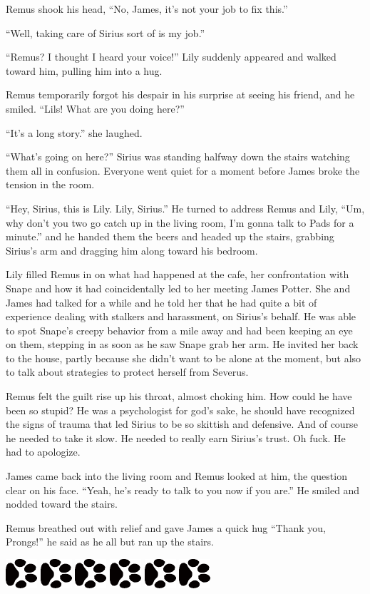 \documentclass[12pt,twoside,openright]{memoir}
\newcommand{\myrulez}{	
	\begin{center}
		\hspace{.5em}
		\includegraphics[angle=60]{dogprint.pdf}
		\hspace{.5em}
		\includegraphics[angle=120]{dogprint.pdf}
		\hspace{.5em}
		\includegraphics[angle=60]{dogprint.pdf}
		\hspace{.5em}
		\includegraphics[angle=120]{dogprint.pdf}
		\hspace{.5em}
		\includegraphics[angle=60]{dogprint.pdf}
		\hspace{.5em}
		\includegraphics[angle=120]{dogprint.pdf}
		\hspace{.5em}
	\end{center}
}
\begin{document}
Remus shook his head, ``No, James, it's not your job to fix this.''

``Well, taking care of Sirius sort of is my job.''

``Remus? I thought I heard your voice!'' Lily suddenly appeared and walked toward him, pulling him into a hug. 

Remus temporarily forgot his despair in his surprise at seeing his friend, and he smiled. ``Lils! What are you doing here?'' 

``It's a long story.'' she laughed. 

``What's going on here?'' Sirius was standing halfway down the stairs watching them all in confusion. Everyone went quiet for a moment before James broke the tension in the room. 

``Hey, Sirius, this is Lily. Lily, Sirius.'' He turned to address Remus and Lily, ``Um, why don't you two go catch up in the living room, I'm gonna talk to Pads for a minute.'' and he handed them the beers and headed up the stairs, grabbing Sirius's arm and dragging him along toward his bedroom.

Lily filled Remus in on what had happened at the cafe, her confrontation with Snape and how it had coincidentally led to her meeting James Potter. She and James had talked for a while and he told her that he had quite a bit of experience dealing with stalkers and harassment, on Sirius's behalf. He was able to spot Snape's creepy behavior from a mile away and had been keeping an eye on them, stepping in as soon as he saw Snape grab her arm. He invited her back to the house, partly because she didn't want to be alone at the moment, but also to talk about strategies to protect herself from Severus.

Remus felt the guilt rise up his throat, almost choking him. How could he have been so stupid? He was a psychologist for god's sake, he should have recognized the signs of trauma that led Sirius to be so skittish and defensive. And of course he needed to take it slow. He needed to really earn Sirius's trust. Oh fuck. He had to apologize.

James came back into the living room and Remus looked at him, the question clear on his face. ``Yeah, he's ready to talk to you now if you are.'' He smiled and nodded toward the stairs. 

Remus breathed out with relief and gave James a quick hug ``Thank you, Prongs!'' he said as he all but ran up the stairs.

\myrulez
\end{document}
